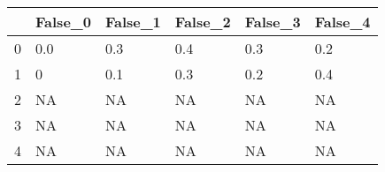 \begin{tabular}{llllll}
\toprule
{} & False\_0 & False\_1 & False\_2 & False\_3 & False\_4 \\ \hline
\midrule
0 &     0.0 &     0.3 &     0.4 &     0.3 &     0.2 \\ \hline
1 &       0 &     0.1 &     0.3 &     0.2 &     0.4 \\ \hline
2 &      NA &      NA &      NA &      NA &      NA \\ \hline
3 &      NA &      NA &      NA &      NA &      NA \\ \hline
4 &      NA &      NA &      NA &      NA &      NA \\ \hline
\bottomrule
\end{tabular}
